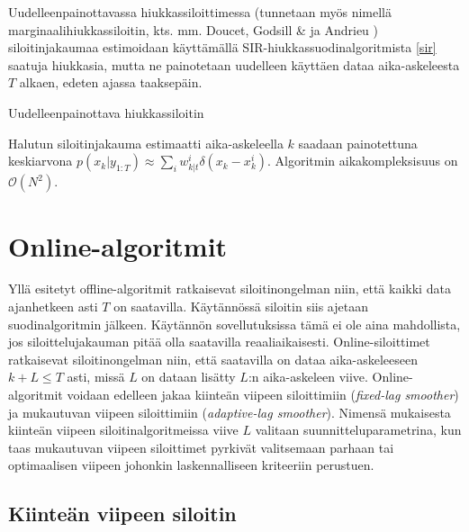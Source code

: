 \documentclass[
  12pt,
  a4paper, twoside]{book}
\begin{document}
Uudelleenpainottavassa hiukkassiloittimessa (tunnetaan myös nimellä marginaalihiukkassiloitin, kts. mm. Doucet, Godsill \& ja Andrieu \citep{Doucet-2000}) siloitinjakaumaa estimoidaan käyttämällä SIR-hiukkassuodinalgoritmista \ref{sir} saatuja hiukkasia, mutta ne painotetaan uudelleen käyttäen dataa aika-askeleesta \(T\) alkaen, edeten ajassa taaksepäin.

\begin{algorithm}[H]
\label{rwps}
\DontPrintSemicolon
\SetAlgoShortEnd
{}
\caption{Uudelleenpainottava hiukkassiloitin}
\end{algorithm}

Halutun siloitinjakauma estimaatti aika-askeleella \(k\) saadaan painotettuna keskiarvona \(p(x_k|y_{1:T}) \approx \sum_i w_{k|t}^i \delta (x_k-x_k^i)\). Algoritmin aikakompleksisuus on \(\mathcal{O}(N^2)\).

\section{Online-algoritmit}

Yllä esitetyt offline-algoritmit ratkaisevat siloitinongelman niin, että kaikki data ajanhetkeen asti \(T\) on saatavilla. Käytännössä siloitin siis ajetaan suodinalgoritmin jälkeen. Käytännön sovellutuksissa tämä ei ole aina mahdollista, jos siloittelujakauman pitää olla saatavilla reaaliaikaisesti. Online-siloittimet ratkaisevat siloitinongelman niin, että saatavilla on dataa aika-askeleeseen \(k+L \le T\) asti, missä \(L\) on dataan lisätty \(L\):n aika-askeleen viive. Online-algoritmit voidaan edelleen jakaa kiinteän viipeen siloittimiin (\emph{fixed-lag smoother}) ja mukautuvan viipeen siloittimiin (\emph{adaptive-lag smoother}). Nimensä mukaisesta kiinteän viipeen siloitinalgoritmeissa viive \(L\) valitaan suunnitteluparametrina, kun taas mukautuvan viipeen siloittimet pyrkivät valitsemaan parhaan tai optimaalisen viipeen johonkin laskennalliseen kriteeriin perustuen.

\subsection{Kiinteän viipeen siloitin}
\end{document}

